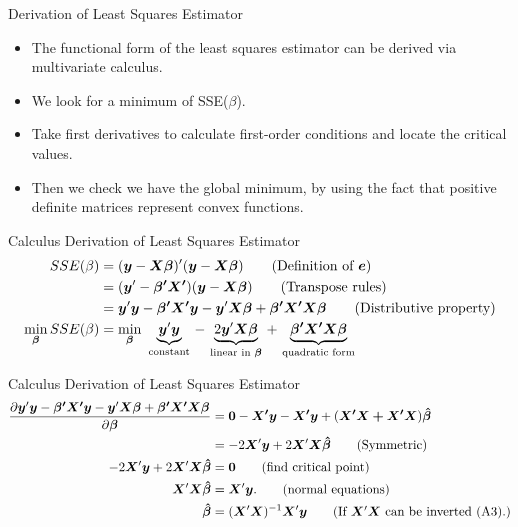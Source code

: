 \documentclass[aspectratio=169, handout]{beamer}
\numberwithin{equation}{section}
\begin{document}
\begin{frame}{Derivation of Least Squares Estimator}
\begin{itemize}
\item The functional form of the least squares estimator can be derived via multivariate calculus.
\item We look for a minimum of SSE($\beta$).
\item Take first derivatives to calculate first-order conditions and locate the critical values.
\item Then we check we have the global minimum, by using the fact that positive definite matrices represent convex functions.
\end{itemize}
\end{frame}


\begin{frame}{Calculus Derivation of Least Squares Estimator}
\begin{align*}
SSE(\beta)&=(\bm{y}-\bm{X\beta})'(\bm{y}-\bm{X\beta}) \tag{Definition of $\bm{e}$}\\
&=(\bm{y}'-\bm{\beta'X'})(\bm{y}-\bm{X\beta}) \tag{Transpose rules}\\
&=\bm{y}'\bm{y}-\bm{\beta'X'y}-\bm{y}'\bm{X\beta}+\bm{\beta'X'X\beta}  \tag{Distributive property}\\
\min_{\bm{\beta}} SSE(\beta)&=\min_{\bm{\beta}}\ \underbrace{\bm{y}'\bm{y}}_{\text{constant}}\,-\,\underbrace{2\bm{y}'\bm{X\beta}}_{\text{linear in }\bm{\beta}}\,+\,\underbrace{\bm{\beta'X'X\beta}}_{\text{quadratic form}}
\end{align*}
\end{frame}

\begin{frame}{Calculus Derivation of Least Squares Estimator}
\begin{align*}
\frac{\partial\bm{y}'\bm{y}-\bm{\beta'X'y}-\bm{y}'\bm{X\beta}+\bm{\beta'X'X\beta}}{\partial\bm{\beta}}&=\bm{0}-\bm{X'y}-\bm{X'y}+(\bm{X'X+X'X})\bm{\hat{\beta}}\\
&=-2\bm{X}'\bm{y}+2\bm{X}'\bm{X}\bm{\hat{\beta}} \tag{Symmetric}\\
-2\bm{X}'\bm{y}+2\bm{X}'\bm{X}\bm{\hat{\beta}}&=\bm{0} \tag{find critical point}\\
\bm{X}'\bm{X}\bm{\hat{\beta}}&=\bm{X}'\bm{y}. \tag{normal equations}\\
\bm{\hat{\beta}}&=(\bm{X}'\bm{X})^{-1}\bm{X}'\bm{y} \tag{If $\bm{X}'\bm{X}$ can be inverted (A3).}
\end{align*}
\end{frame}
\end{document}
